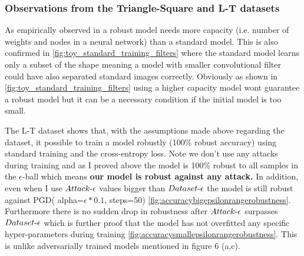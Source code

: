 \documentclass[../thesis.tex]{subfiles}
\begin{document}
	
	
	\subsubsection{Observations from the Triangle-Square and L-T datasets}
	
	As empirically observed in \cite{adv_training_madry} a robust model needs more capacity (i.e. number of weights and nodes in a neural network) than a standard model. This is also confirmed in \ref{fig:toy_standard_training_filters} where the standard model learns only a subset of the shape meaning a model with smaller convolutional filter could have also separated standard images correctly. Obviously as shown in \ref{fig:toy_standard_training_filters} using a higher capacity model wont guarantee a robust model but it can be a necessary condition if the initial model is too small.
	
	
	The L-T dataset shows that, with the assumptions made above regarding the dataset, it possible to train a model robustly (100\% robust accuracy) using standard training and the cross-entropy loss. Note we don't use any attacks during training and as I proved above the model is 100\% robust to all samples in the $\epsilon$-ball which means \textbf{our model is robust against any attack.} In addition, even when I use $Attack\text{-}\epsilon$ values bigger than $Dataset\text{-}\epsilon$ the model is still robust against PGD( alpha=$\epsilon*0.1$, steps=50) \ref{fig:accuracybigepsilonrangerobustness}. Furthermore there is no sudden drop in robustness after $Attack\text{-}\epsilon$ surpasses $Dataset\text{-}\epsilon$ which is further proof that the model has not overfitted any specific hyper-parameters during training \ref{fig:accuracysmallepsilonrangerobustness}. This is unlike adversarially trained models mentioned in \cite{adv_training_madry} figure 6 (a,c). 
	
\end{document}
